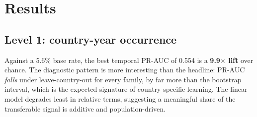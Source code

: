 \documentclass[11pt]{article}
\begin{document}
\section{Results}
\label{sec:results}

\subsection{Level 1: country-year occurrence}

\begin{table}[H]
\centering
\caption{Level 1 performance under three validation schemes. PR-AUC is the primary metric;
brackets give 95\% bootstrap intervals on the temporal holdout. $\star$ marks the model selected on
leave-country-out PR-AUC.}
\label{tab:level1}
\end{table}

\noindent
Against a 5.6\% base rate, the best temporal PR-AUC of 0.554
is a \textbf{9.9$\times$ lift} over chance. The diagnostic pattern is more interesting than
the headline: PR-AUC \emph{falls} under leave-country-out for every family, by far more than the
bootstrap interval, which is the expected signature of country-specific learning. The linear model
degrades least in relative terms, suggesting a meaningful share of the transferable signal is
additive and population-driven.
\end{document}
